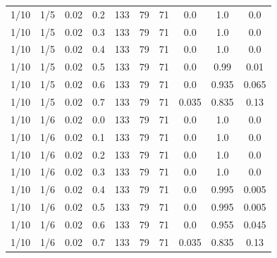 \documentclass[specialist, substylefile = spbu.rtx,
			   subf, href, 12pt]{disser}
\begin{document}
\begin{table}[!hhh]
\begin{tabular}{cccccccccc}
		1/10 &      1/5 &       0.02 &    0.2 & 133 & 79 & 71 &    0.0 &    1.0 &    0.0 \\
		1/10 &      1/5 &       0.02 &    0.3 & 133 & 79 & 71 &    0.0 &    1.0 &    0.0 \\
		1/10 &      1/5 &       0.02 &    0.4 & 133 & 79 & 71 &    0.0 &    1.0 &    0.0 \\
		1/10 &      1/5 &       0.02 &    0.5 & 133 & 79 & 71 &    0.0 &   0.99 &   0.01 \\
		1/10 &      1/5 &       0.02 &    0.6 & 133 & 79 & 71 &    0.0 &  0.935 &  0.065 \\
		1/10 &      1/5 &       0.02 &    0.7 & 133 & 79 & 71 &  0.035 &  0.835 &   0.13 \\
		\hline
		1/10 &      1/6 &       0.02 &    0.0 & 133 & 79 & 71 &    0.0 &    1.0 &    0.0 \\
		1/10 &      1/6 &       0.02 &    0.1 & 133 & 79 & 71 &    0.0 &    1.0 &    0.0 \\
		1/10 &      1/6 &       0.02 &    0.2 & 133 & 79 & 71 &    0.0 &    1.0 &    0.0 \\
		1/10 &      1/6 &       0.02 &    0.3 & 133 & 79 & 71 &    0.0 &    1.0 &    0.0 \\
		1/10 &      1/6 &       0.02 &    0.4 & 133 & 79 & 71 &    0.0 &  0.995 &  0.005 \\
		1/10 &      1/6 &       0.02 &    0.5 & 133 & 79 & 71 &    0.0 &  0.995 &  0.005 \\
		1/10 &      1/6 &       0.02 &    0.6 & 133 & 79 & 71 &    0.0 &  0.955 &  0.045 \\
		1/10 &      1/6 &       0.02 &    0.7 & 133 & 79 & 71 &  0.035 &  0.835 &   0.13 \\
		\bottomrule
	\end{tabular}
	\label{tab:simplified_system_results_k=30_1}
\end{table}
\end{document}
